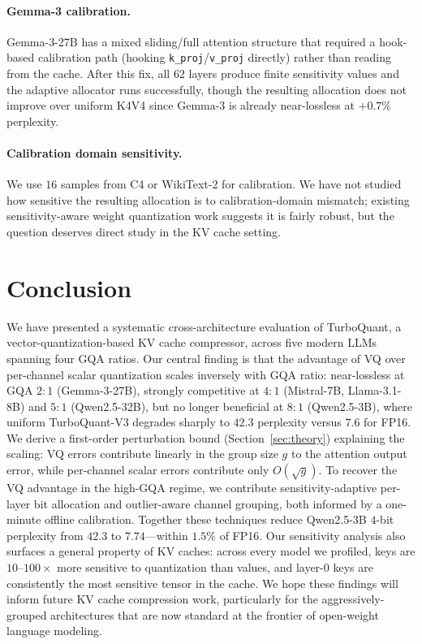 \documentclass[11pt]{article}
\begin{document}
\paragraph{Gemma-3 calibration.}
Gemma-3-27B has a mixed sliding/full attention structure that required a hook-based calibration path (hooking \texttt{k\_proj}/\texttt{v\_proj} directly) rather than reading from the cache. After this fix, all $62$ layers produce finite sensitivity values and the adaptive allocator runs successfully, though the resulting allocation does not improve over uniform K4V4 since Gemma-3 is already near-lossless at $+0.7\%$ perplexity.

\paragraph{Calibration domain sensitivity.}
We use $16$ samples from C4 or WikiText-2 for calibration. We have not studied how sensitive the resulting allocation is to calibration-domain mismatch; existing sensitivity-aware weight quantization work suggests it is fairly robust, but the question deserves direct study in the KV cache setting.

\section{Conclusion}
\label{sec:conclusion}

We have presented a systematic cross-architecture evaluation of TurboQuant, a vector-quantization-based KV cache compressor, across five modern LLMs spanning four GQA ratios. Our central finding is that the advantage of VQ over per-channel scalar quantization scales inversely with GQA ratio: near-lossless at GQA $2{:}1$ (Gemma-3-27B), strongly competitive at $4{:}1$ (Mistral-7B, Llama-3.1-8B) and $5{:}1$ (Qwen2.5-32B), but no longer beneficial at $8{:}1$ (Qwen2.5-3B), where uniform TurboQuant-V3 degrades sharply to $42.3$ perplexity versus $7.6$ for FP16. We derive a first-order perturbation bound (Section~\ref{sec:theory}) explaining the scaling: VQ errors contribute linearly in the group size $g$ to the attention output error, while per-channel scalar errors contribute only $O(\sqrt{g})$. To recover the VQ advantage in the high-GQA regime, we contribute sensitivity-adaptive per-layer bit allocation and outlier-aware channel grouping, both informed by a one-minute offline calibration. Together these techniques reduce Qwen2.5-3B $4$-bit perplexity from $42.3$ to $7.74$---within $1.5\%$ of FP16. Our sensitivity analysis also surfaces a general property of KV caches: across every model we profiled, keys are $10$--$100\times$ more sensitive to quantization than values, and layer-$0$ keys are consistently the most sensitive tensor in the cache. We hope these findings will inform future KV cache compression work, particularly for the aggressively-grouped architectures that are now standard at the frontier of open-weight language modeling.



\end{document}

